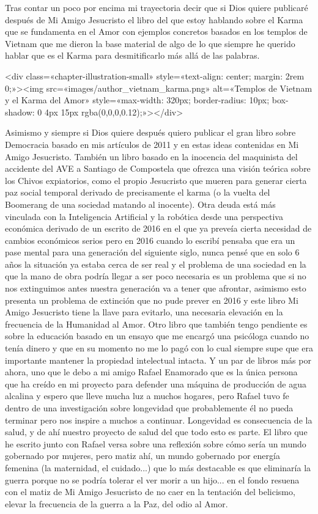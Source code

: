\documentclass[11pt,a5paper]{book}
\begin{document}
Tras contar un poco por encima mi trayectoria decir que si Dios quiere publicaré después de Mi Amigo Jesucristo el libro del que estoy hablando sobre el Karma que se fundamenta en el Amor con ejemplos concretos basados en los templos de Vietnam que me dieron la base material de algo de lo que siempre he querido hablar que es el Karma para desmitificarlo más allá de las palabras.

<div class=«chapter-illustration-small» style=«text-align: center; margin: 2rem 0;»><img src=«images/author_vietnam_karma.png» alt=«Templos de Vietnam y el Karma del Amor» style=«max-width: 320px; border-radius: 10px; box-shadow: 0 4px 15px rgba(0,0,0,0.12);»></div>

Asimismo y siempre si Dios quiere después quiero publicar el gran libro sobre Democracia basado en mis artículos de 2011 y en estas ideas contenidas en Mi Amigo Jesucristo. También un libro basado en la inocencia del maquinista del accidente del AVE a Santiago de Compostela que ofrezca una visión teórica sobre los Chivos expiatorios, como el propio Jesucristo que mueren para generar cierta paz social temporal derivado de precisamente el karma (o la vuelta del Boomerang de una sociedad matando al inocente). Otra deuda está más vinculada con la Inteligencia Artificial y la robótica desde una perspectiva económica derivado de un escrito de 2016 en el que ya preveía cierta necesidad de cambios económicos serios pero en 2016 cuando lo escribí pensaba que era un pase mental para una generación del siguiente siglo, nunca pensé que en solo 6 años la situación ya estaba cerca de ser real y el problema de una sociedad en la que la mano de obra podría llegar a ser poco necesaria es un problema que si no nos extinguimos antes nuestra generación va a tener que afrontar, asimismo esto presenta un problema de extinción que no pude prever en 2016 y este libro Mi Amigo Jesucristo tiene la llave para evitarlo, una necesaria elevación en la frecuencia de la Humanidad al Amor. Otro libro que también tengo pendiente es sobre la educación basado en un ensayo que me encargó una psicóloga cuando no tenía dinero y que en su momento no me lo pagó con lo cual siempre supe que era importante mantener la propiedad intelectual intacta. Y un par de libros más por ahora, uno que le debo a mi amigo Rafael Enamorado que es la única persona que ha creído en mi proyecto para defender una máquina de producción de agua alcalina y espero que lleve mucha luz a muchos hogares, pero Rafael tuvo fe dentro de una investigación sobre longevidad que probablemente él no pueda terminar pero nos inspire a muchos a continuar. Longevidad es consecuencia de la salud, y de ahí nuestro proyecto de salud del que todo esto es parte. El libro que he escrito junto con Rafael versa sobre una reflexión sobre cómo sería un mundo gobernado por mujeres, pero matiz ahí, un mundo gobernado por energía femenina (la maternidad, el cuidado...) que lo más destacable es que eliminaría la guerra porque no se podría tolerar el ver morir a un hijo... en el fondo resuena con el matiz de Mi Amigo Jesucristo de no caer en la tentación del belicismo, elevar la frecuencia de la guerra a la Paz, del odio al Amor. 
\end{document}
